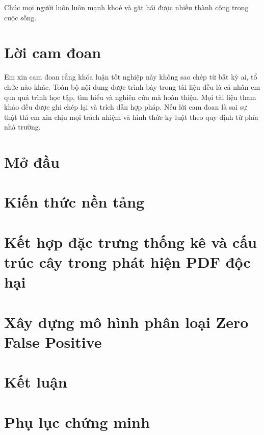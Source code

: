 \documentclass[12pt,a4paper]{report}
\begin{document}
Chúc mọi người luôn luôn mạnh khoẻ và gặt hái được nhiều thành công trong cuộc sống.

\chapter*{Lời cam đoan}

Em xin cam đoan rằng khóa luận tốt nghiệp này không sao chép từ bất kỳ ai,
tổ chức nào khác. Toàn bộ nội dung được trình bày trong tài liệu đều là cá nhân em qua quá
trình học tập, tìm hiểu và nghiên cứu mà hoàn thiện. Mọi tài liệu tham khảo đều được ghi chép
lại và trích dẫn hợp pháp. Nếu lời cam đoan là sai sự thật thì em xin chịu mọi trách nhiệm và
hình thức kỷ luật theo quy định từ phía nhà trường.

\tableofcontents{}
\clearpage{}

\listoffigures{}

\listoftables{}

\lstlistoflistings

\chapter*{Mở đầu}



\chapter{Kiến thức nền tảng}



\chapter{Kết hợp đặc trưng thống kê và cấu trúc cây trong phát hiện PDF độc hại}


\chapter{Xây dựng mô hình phân loại Zero False Positive}




\chapter{Kết luận}



\appendix
\chapter{Phụ lục chứng minh}




\nocite{*}

\printbibliography[heading=bibintoc, title=Tài liệu tham khảo]

\end{document}
